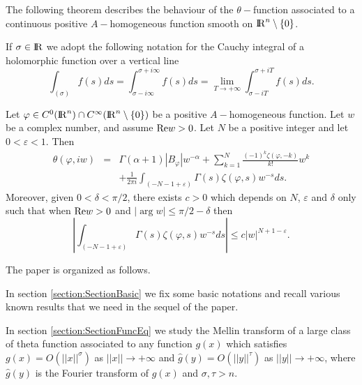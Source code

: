 \documentclass[12pt,a4paper]{amsart}
\begin{document}
The following theorem describes the behaviour of the $\theta-$function
associated to a continuous positive ${A}-$homogeneous function
smooth on ${{\rm I\kern-.185em R}}^{n}\setminus\{0\}$.

If ${\sigma}\in{{\rm I\kern-.185em R}}$ we adopt the following notation
for the Cauchy integral of a holomorphic function over a vertical line
\begin{equation}\nonumber
	\int_{({\sigma})}f({s})d{s}
	=\int_{{\sigma}-i\infty}^{{\sigma}+i\infty}f({s})d{s}
	=\lim_{T\to+\infty}\int_{{\sigma}-iT}^{{\sigma}+iT}
		f({s})d{s}.
\end{equation}

\begin{theorem}\label{thm::ThetaAsymptotic}
Let ${\varphi}\in C^0({{\rm I\kern-.185em R}}^{n})\cap C^{\infty}({{\rm I\kern-.185em R}}^{n}\setminus\{0\})$
be a positive ${A}-$homogeneous function.
Let ${w}$ be a complex number, and assume ${\mathop{\rm Re}\nolimits}{w}>0$.
Let ${N}$ be a positive integer and let $0<{\varepsilon}<1$.
Then
\begin{eqnarray}\label{eq::ThetaAsymptotic}
\theta({\varphi},i{w})&=&
\Gamma({\alpha}+1){\left|{{B}_{\varphi}}\right|}{w}^{-{\alpha}}+
\sum_{{k}=1}^{N}
	\frac{(-1)^{k}{\zeta}({\varphi},-{k})}{{k}!}{w}^{k}
\\
\nonumber
&&+
\frac{1}{2\pi i}\int_{(-{N}-1+{\varepsilon})}\Gamma({s}){\zeta}({\varphi},{s})
	{w}^{-{s}}d{s}.
\end{eqnarray}
Moreover, given $0<{\delta}<\pi/2$, there exists ${c}>0$ which
depends on ${N}$, ${\varepsilon}$ and ${\delta}$ only such that when
${\mathop{\rm Re}\nolimits}{w}>0$ and ${\left|{\arg{w}}\right|}\leq\pi/2-{\delta}$ then
\begin{equation}\label{eq::ThetaAsymptoticEstimate}
{\left|{\int_{(-N-1+{\varepsilon})}
	\Gamma({s}){\zeta}({\varphi},{s})
	{w}^{-{s}}d{s}}\right|}
\leq{c}{\left|{w}\right|}^{N+1-{\varepsilon}}.
\end{equation}
\end{theorem}

The paper is organized as follows.

In section \ref{section:SectionBasic} we fix some basic notations
and recall various known results that we need in the sequel of the paper.

In section \ref{section:SectionFuncEq} we study the Mellin transform
of a large class of theta function associated to any function $g(x)$
which satisfies $g(x)=O({\left|\!\left|{x}\right|\!\right|}^{\sigma})$ as ${\left|\!\left|{x}\right|\!\right|}\to+\infty$
and $\hat g(y)=O({\left|\!\left|{y}\right|\!\right|}^{\tau})$ as ${\left|\!\left|{y}\right|\!\right|}\to+\infty$, where 
$\hat g(y)$ is the Fourier transform of $g(x)$ and ${\sigma},{\tau}>n$.
\end{document}
